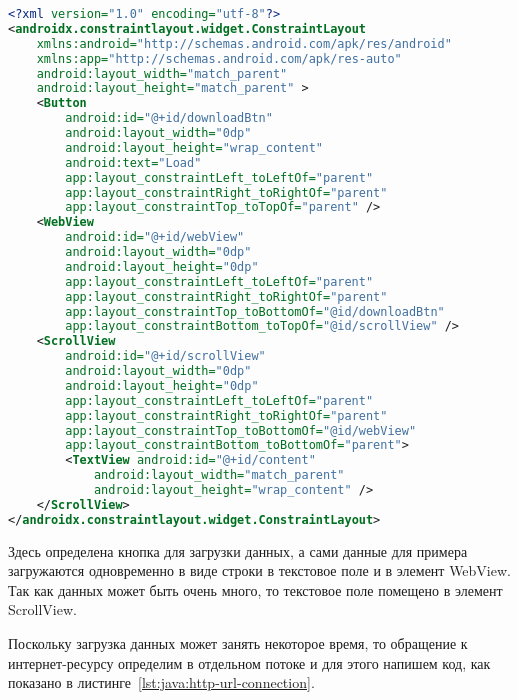 \begin{lstlisting}[language=XML
	, label=lst:xml:http-url-connection
	]
<?xml version="1.0" encoding="utf-8"?>
<androidx.constraintlayout.widget.ConstraintLayout
    xmlns:android="http://schemas.android.com/apk/res/android"
    xmlns:app="http://schemas.android.com/apk/res-auto"
    android:layout_width="match_parent"
    android:layout_height="match_parent" >
    <Button
        android:id="@+id/downloadBtn"
        android:layout_width="0dp"
        android:layout_height="wrap_content"
        android:text="Load"
        app:layout_constraintLeft_toLeftOf="parent"
        app:layout_constraintRight_toRightOf="parent"
        app:layout_constraintTop_toTopOf="parent" />
    <WebView
        android:id="@+id/webView"
        android:layout_width="0dp"
        android:layout_height="0dp"
        app:layout_constraintLeft_toLeftOf="parent"
        app:layout_constraintRight_toRightOf="parent"
        app:layout_constraintTop_toBottomOf="@id/downloadBtn"
        app:layout_constraintBottom_toTopOf="@id/scrollView" />
    <ScrollView
        android:id="@+id/scrollView"
        android:layout_width="0dp"
        android:layout_height="0dp"
        app:layout_constraintLeft_toLeftOf="parent"
        app:layout_constraintRight_toRightOf="parent"
        app:layout_constraintTop_toBottomOf="@id/webView"
        app:layout_constraintBottom_toBottomOf="parent">
        <TextView android:id="@+id/content"
            android:layout_width="match_parent"
            android:layout_height="wrap_content" />
    </ScrollView>
</androidx.constraintlayout.widget.ConstraintLayout>
\end{lstlisting}

Здесь определена кнопка для загрузки данных, а сами данные для примера
загружаются одновременно в виде строки в текстовое поле и в элемент
WebView. Так как данных может быть очень много, то текстовое поле
помещено в элемент ScrollView.\par
Поскольку загрузка данных может занять некоторое время, то обращение к
интернет-ресурсу определим в отдельном потоке и для этого напишем код,
как показано в листинге~\ref{lst:java:http-url-connection}.

